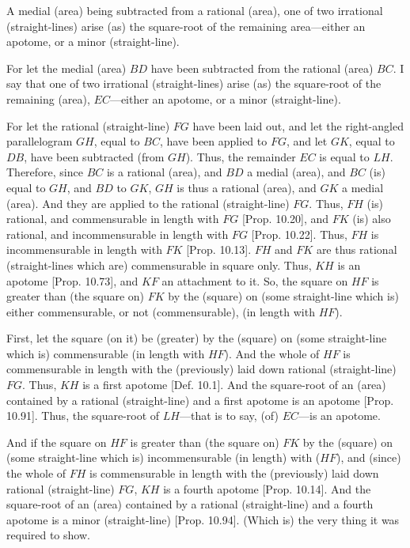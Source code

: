 \begin{Parallel}{}{}
{A
medial (area) being subtracted from a rational (area), one of two irrational (straight-lines)
arise (as) the square-root of the remaining area---either an apotome, or a minor (straight-line).

\epsfysize=1.5in
\centerline{}

For let the medial (area) $BD$ have been subtracted from the
rational (area) $BC$. I say that  one of two irrational (straight-lines) arise
(as) the square-root of the
remaining (area), $EC$---either
an apotome, or a minor (straight-line).

For let the rational (straight-line) $FG$ have been laid out,
and let the right-angled parallelogram $GH$, equal to $BC$, have
been applied to $FG$, and let $GK$, equal to $DB$, have
been subtracted (from $GH$).  Thus, the remainder $EC$
is equal to $LH$. Therefore, since $BC$
is a rational (area), and $BD$ a medial (area), and $BC$
(is) equal to $GH$, and $BD$ to $GK$, $GH$ is thus a rational (area),
and $GK$ a medial (area). And they are applied to the rational (straight-line)
$FG$. Thus, $FH$ (is) rational, and commensurable in length with $FG$
[Prop. 10.20], and $FK$ (is) also rational, and
incommensurable in length with $FG$ [Prop. 10.22]. Thus, $FH$ is incommensurable
in length with $FK$ [Prop. 10.13]. 
$FH$ and $FK$ are thus rational (straight-lines which are) commensurable
in square only. Thus, $KH$ is an apotome [Prop. 10.73], and $KF$ an attachment to it.
So, the square on $HF$ is  greater than (the square on) $FK$ by
the (square) on (some straight-line which is) either commensurable,
or not (commensurable), (in length with $HF$).

First, let the square (on it) be (greater) by the (square) on  (some straight-line
which is) commensurable
(in length with $HF$). And the whole of $HF$ is commensurable
in length with the (previously) laid down rational (straight-line) $FG$. 
Thus, $KH$ is a first apotome [Def. 10.1]. And
the square-root of an (area) contained by a rational (straight-line)
and a first apotome is an apotome [Prop. 10.91]. 
Thus, the square-root of $LH$---that is to say, (of) $EC$---is an apotome.

And if the square on  $HF$ is greater than (the square on) $FK$ by the
(square) on (some straight-line which is) incommensurable (in length) with ($HF$),
and (since) the whole of $FH$ is commensurable in length with
the (previously) laid down rational (straight-line) $FG$, $KH$ is a fourth
apotome [Prop. 10.14]. And the square-root
of an (area) contained by a rational (straight-line) and a fourth apotome
is a minor (straight-line)
[Prop. 10.94]. (Which is) the very thing it was required to show.}
\end{Parallel}

